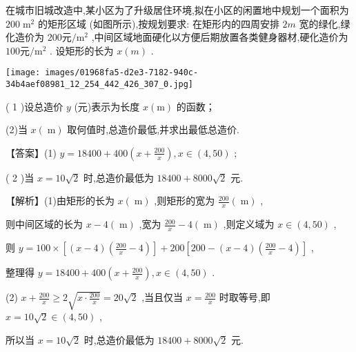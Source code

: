 \documentclass[11pt,a4paper]{article}
\begin{document}
\begin{problem} 
在城市旧城改造中,某小区为了升级居住环境,拟在小区的闲置地中规划一个面积为 \(\displaystyle {200}{\mathrm{\;m}}^{2}\) 的矩形区域 (如图所示),按规划要求: 在矩形内的四周安排 \(\displaystyle {2m}\) 宽的绿化,绿化造价为 \(\displaystyle {200}\mathrm{元}/{\mathrm{m}}^{2}\) ,中间区域地面硬化以方便后期放置各类健身器材,硬化造价为 \(\displaystyle {100}\mathrm{元}/{\mathrm{m}}^{2}\) . 设矩形的长为 \(\displaystyle x\left( m\right)\) .


\texttt{[image: images/01968fa5-d2e3-7182-940c-34b4aef08981\_12\_254\_442\_426\_307\_0.jpg]}

 

( 1 )设总造价 \(\displaystyle y\) (元)表示为长度 \(\displaystyle x\left( \mathrm{m}\right)\) 的函数；

(2)当 \(\displaystyle x\left( \mathrm{\;m}\right)\) 取何值时,总造价最低,并求出最低总造价.
\begin{jiexi}[65]
【答案】(1) \(\displaystyle y = {18400} + {400}\left( {x + \frac{200}{x}}\right) ,x \in  \left( {4,{50}}\right)\) ;

( 2 )当 \(\displaystyle x = {10}\sqrt{2}\) 时,总造价最低为 \(\displaystyle {18400} + {8000}\sqrt{2}\) 元.

【解析】(1)由矩形的长为 \(\displaystyle x\left( \mathrm{\;m}\right)\) ,则矩形的宽为 \(\displaystyle \frac{200}{x}\left( \mathrm{\;m}\right)\) ,

则中间区域的长为 \(\displaystyle x - 4\left( \mathrm{\;m}\right)\) ,宽为 \(\displaystyle \frac{200}{x} - 4\left( \mathrm{\;m}\right)\) ,则定义域为 \(\displaystyle x \in  \left( {4,{50}}\right)\) ,

则 \(\displaystyle y = {100} \times  \left\lbrack  {\left( {x - 4}\right) \left( {\frac{200}{x} - 4}\right) }\right\rbrack   + {200}\left\lbrack  {{200} - \left( {x - 4}\right) \left( {\frac{200}{x} - 4}\right) }\right\rbrack\) ,

整理得 \(\displaystyle y = {18400} + {400}\left( {x + \frac{200}{x}}\right) ,x \in  \left( {4,{50}}\right)\) .

(2) \(\displaystyle x + \frac{200}{x} \geq  2\sqrt{x \cdot  \frac{200}{x}} = {20}\sqrt{2}\) ,当且仅当 \(\displaystyle x = \frac{200}{x}\) 时取等号,即 \(\displaystyle x = {10}\sqrt{2} \in  \left( {4,{50}}\right)\) ,

所以当 \(\displaystyle x = {10}\sqrt{2}\) 时,总造价最低为 \(\displaystyle {18400} + {8000}\sqrt{2}\) 元.


\end{jiexi}
\end{problem}
\end{document}
